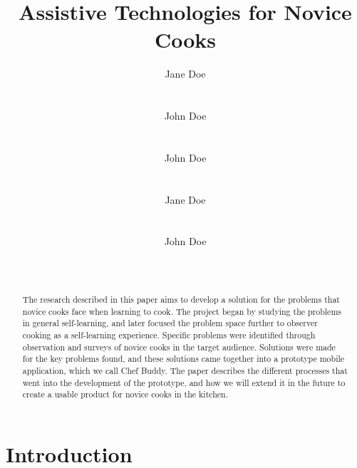 \documentclass{sigchi}
\begin{document}
\title{Assistive Technologies for Novice Cooks}

\author{
  \alignauthor Jane Doe\\
    \\
    \\
  \alignauthor John Doe\\
    \\
    \\
  \alignauthor John Doe\\
    \\
    \\
  \alignauthor Jane Doe\\
    \\
    \\
  \alignauthor John Doe\\
    \\
    \\
}


\maketitle

\begin{abstract}
The research described in this paper aims to develop a solution for the problems that novice cooks face when learning to cook. The project began by studying the problems in general self-learning, and later focused the problem space further to observer cooking as a self-learning experience. Specific problems were identified through observation and surveys of novice cooks in the target audience. Solutions were made for the key problems found, and these solutions came together into a prototype mobile application, which we call Chef Buddy. The paper describes the different processes that went into the development of the prototype, and how we will extend it in the future to create a usable product for novice cooks in the kitchen.
\end{abstract}



\section{Introduction}
\end{document}

